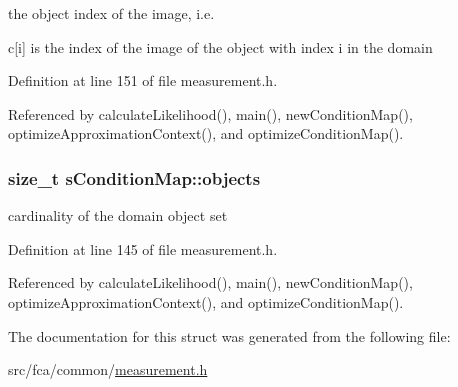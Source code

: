 the object index of the image, i.\-e. 

c\mbox{[}i\mbox{]} is the index of the image of the object with index i in the domain 

\-Definition at line 151 of file measurement.\-h.



\-Referenced by calculate\-Likelihood(), main(), new\-Condition\-Map(), optimize\-Approximation\-Context(), and optimize\-Condition\-Map().

\hypertarget{structsConditionMap_aba0e3734a3c3c6de4f39d9a6c72f3cca}{
\subsubsection[{objects}]{\setlength{\rightskip}{0pt plus 5cm}size\-\_\-t {\bf s\-Condition\-Map\-::objects}}}\label{structsConditionMap_aba0e3734a3c3c6de4f39d9a6c72f3cca}


cardinality of the domain object set 



\-Definition at line 145 of file measurement.\-h.



\-Referenced by calculate\-Likelihood(), main(), new\-Condition\-Map(), optimize\-Approximation\-Context(), and optimize\-Condition\-Map().



\-The documentation for this struct was generated from the following file\-:\begin{DoxyCompactItemize}
\item 
src/fca/common/\hyperlink{common_2measurement_8h}{measurement.\-h}\end{DoxyCompactItemize}
